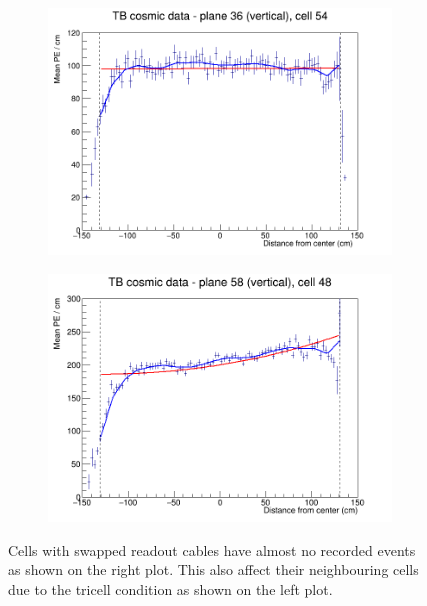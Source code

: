 \documentclass[12pt,a4paper]{article}
\begin{document}
\begin{figure}[h]
  \begin{subfigure}{0.5\textwidth}
    \includegraphics[width=\linewidth]{RelativeCalibrationResults/ep3abc_036_054.png}
  \end{subfigure}
  \begin{subfigure}{0.5\textwidth}
    \includegraphics[width=\linewidth]{RelativeCalibrationResults/ep3abc_058_048_ExtendedRange.png}
  \end{subfigure}
  \caption{Cells with swapped readout cables have almost no recorded events as shown on the right plot. This also affect their neighbouring cells due to the tricell condition as shown on the left plot.}
  \label{figAttenfitResultsEpoch3abc_FaultyFEBs}
\end{figure}
\end{document}
